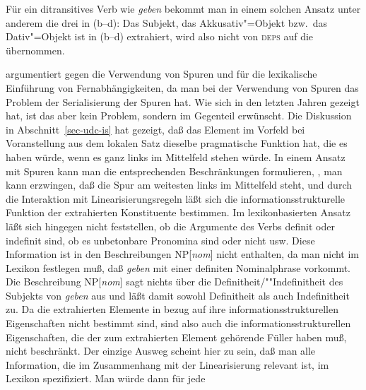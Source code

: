 \noindent
Für ein ditransitives Verb wie \emph{geben} bekommt man in einem solchen Ansatz
unter anderem die drei \subcatlen in (b--d):
\eal
\ex {}
\ex {}
\ex {}
\ex {}
\zl
Das Subjekt, das Akkusativ"=Objekt bzw.\ das Dativ"=Objekt ist in (b--d) extrahiert, wird
also nicht von \textsc{deps} auf die \subcatl übernommen.

\citet[--148]{Nerbonne94a} argumentiert gegen die Verwendung von Spuren und für
die lexikalische Einführung von Fernabhängigkeiten, da man bei der Verwendung von Spuren
das Problem der Serialisierung der Spuren hat. Wie sich in den letzten Jahren gezeigt hat,
ist das aber kein Problem, sondern im Gegenteil erwünscht.
Die Diskussion in Abschnitt~\ref{sec-udc-is} hat gezeigt, daß das Element im Vorfeld
bei Voranstellung aus dem lokalen Satz dieselbe pragmatische Funktion hat, die es
haben würde, wenn es ganz links im Mittelfeld stehen würde. In einem Ansatz mit Spuren kann
man die entsprechenden Beschränkungen formulieren, \dash, man kann erzwingen, daß die
Spur am weitesten links im Mittelfeld steht, und durch die Interaktion mit Linearisierungsregeln
läßt sich die informationsstrukturelle Funktion der extrahierten Konstituente bestimmen.
Im lexikonbasierten Ansatz läßt sich hingegen nicht feststellen, ob die Argumente
des Verbs definit oder indefinit sind, ob es unbetonbare Pronomina sind oder nicht usw.
Diese Information ist in den Beschreibungen NP[\textit{nom}] nicht enthalten, da man nicht im
Lexikon festlegen muß, daß \emph{geben} mit einer definiten Nominalphrase vorkommt. Die Beschreibung
NP[\textit{nom}] sagt nichts über die Definitheit/""Indefinitheit des Subjekts von \emph{geben} aus
und läßt damit sowohl Definitheit als auch Indefinitheit zu.
Da die extrahierten Elemente in bezug auf ihre informationsstrukturellen Eigenschaften nicht
bestimmt sind, sind also auch die informationsstrukturellen Eigenschaften, die der zum extrahierten
Element gehörende Füller haben muß, nicht beschränkt.
Der einzige Ausweg scheint hier zu sein, daß man alle Information, die im Zusammenhang
mit der Linearisierung relevant ist, im Lexikon spezifiziert. Man würde dann für jede
